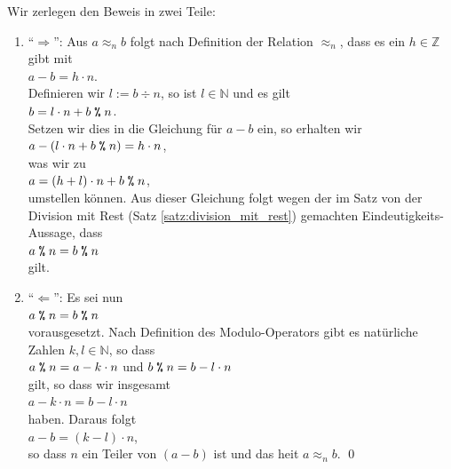 \proof
Wir zerlegen den Beweis in zwei Teile:
\begin{enumerate}
\item ``$\Rightarrow$'':
      Aus $a \approx_n b$ folgt nach Definition der Relation $\approx_n$, dass es ein $h \in \mathbb{Z}$ gibt mit
      \\[0.2cm]
      \hspace*{1.3cm}
      $a - b = h \cdot n$.
      \\[0.2cm]
      Definieren wir $l := b \div n$, so ist $l \in \mathbb{N}$ und es gilt
      \\[0.2cm]
      \hspace*{1.3cm}
      $b = l \cdot n + b \;\texttt{\%}\; n$.
      \\[0.2cm]
      Setzen wir dies in die Gleichung f\"{u}r $a - b$ ein, so erhalten wir
      \\[0.2cm]
      \hspace*{1.3cm}
      $a - (l \cdot n + b \;\texttt{\%}\; n) = h \cdot n$,
      \\[0.2cm]
      was wir zu
      \\[0.2cm]
      \hspace*{1.3cm}
      $a = (h + l) \cdot n + b \;\texttt{\%}\; n$,
      \\[0.2cm]
      umstellen k\"{o}nnen.  Aus dieser Gleichung folgt wegen der im Satz von der Division mit Rest 
      (Satz \ref{satz:division_mit_rest})
      gemachten Eindeutigkeits-Aussage, dass
      \\[0.2cm]
      \hspace*{1.3cm}
      $a \;\texttt{\%}\; n = b \;\texttt{\%}\; n$
      \\[0.2cm]
      gilt. \checkmark
\item ``$\Leftarrow$'':
      Es sei nun 
      \\[0.2cm]
      \hspace*{1.3cm}
      $a \;\texttt{\%}\; n = b \;\texttt{\%}\; n$ 
      \\[0.2cm]
      vorausgesetzt. Nach Definition des Modulo-Operators gibt es nat\"{u}rliche Zahlen
      $k,l \in \mathbb{N}$, so dass 
      \\[0.2cm]
      \hspace*{1.3cm}
      $a \;\texttt{\%}\; n = a - k \cdot n$ \quad und \quad
      $b \;\texttt{\%}\; n = b - l \cdot n$ 
      \\[0.2cm]
      gilt, so dass wir insgesamt
      \\[0.2cm]
      \hspace*{1.3cm}
      $a - k \cdot n = b - l \cdot n$
      \\[0.2cm]
      haben.   Daraus folgt
      \\[0.2cm]
      \hspace*{1.3cm}
      $a - b = (k - l) \cdot n$,
      \\[0.2cm]
      so dass $n$ ein Teiler von $(a- b)$ ist und das hei\3t $a \approx_n b$. \checkmark \qed
\end{enumerate}


